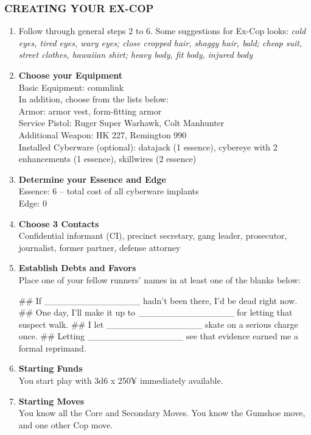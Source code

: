 \subsubsection{CREATING YOUR EX-COP}
\begin{enumerate}
    \item Follow through general steps 2 to 6. Some suggestions for Ex-Cop looks: \textit{cold eyes, tired eyes, wary eyes; close cropped hair, shaggy hair, bald; cheap suit, street clothes, hawaiian shirt; heavy body, fit body, injured body}
    
    \item \textbf{Choose your Equipment} \\
    Basic Equipment: commlink \\
    In addition, choose from the lists below: \\
        Armor: armor vest, form-fitting armor \\
        Service Pistol: Ruger Super Warhawk, Colt Manhunter \\
        Additional Weapon: HK 227, Remington 990 \\
        Installed Cyberware (optional): datajack (1 essence), cybereye with 2 enhancements (1 essence), skillwires (2 essence)
    
    \item \textbf{Determine your Essence and Edge} \\
    Essence: 6 – total cost of all cyberware implants \\
    Edge: 0
    
    \item \textbf{Choose 3 Contacts} \\
    Confidential informant (CI), precinct secretary, gang leader, prosecutor, journalist, former partner, defense attorney
    
    \item \textbf{Establish Debts and Favors} \\
    Place one of your fellow runners’ names in at least one of the blanks below:
        \begin{easylist}
            ## If \_\_\_\_\_\_\_\_\_\_\_\_\_\_\_ hadn’t been there, I’d be dead right now.
            ## One day, I’ll make it up to \_\_\_\_\_\_\_\_\_\_\_\_\_\_\_ for letting that suspect walk.
            ## I let \_\_\_\_\_\_\_\_\_\_\_\_\_\_\_ skate on a serious charge once.
            ## Letting \_\_\_\_\_\_\_\_\_\_\_\_\_\_\_ see that evidence earned me a formal reprimand.
        \end{easylist}
    
    \item \textbf{Starting Funds} \\
    You start play with 3d6 x 250¥ immediately available.
    
    \item \textbf{Starting Moves} \\
    You know all the Core and Secondary Moves.
    You know the Gumshoe move, and one other Cop move.
\end{enumerate}

